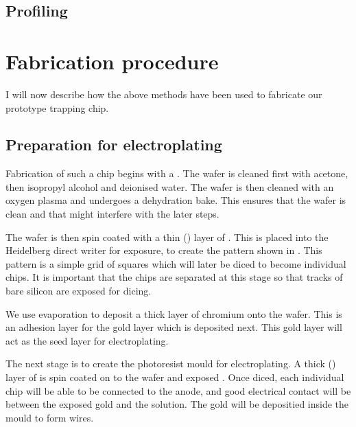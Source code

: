 \subsection{Profiling}


\section{Fabrication procedure}
\label{fab:procedure}


I will now describe how the above methods have been used to fabricate our
prototype trapping chip.

\subsection{Preparation for electroplating}

Fabrication of such a chip begins with a . The wafer
is cleaned first with acetone, then isopropyl alcohol and deionised water. The
wafer is then cleaned with an oxygen plasma and undergoes a dehydration bake.
This ensures that the wafer is clean and  that
might interfere with the later steps.

The wafer is then spin coated with a thin () layer of . This is placed into the Heidelberg direct writer for exposure, to
create the pattern shown in . This pattern is a simple grid of
 squares which will later be diced to become individual chips.
It is important that the chips are separated at this stage so that tracks of
bare silicon are exposed for dicing.

We use evaporation to deposit a  thick layer of chromium onto the
wafer. This is an adhesion layer for the  gold layer which is
deposited next. This gold layer will act as the seed layer for electroplating.

The next stage is to create the photoresist mould for electroplating. A thick
() layer of  is spin coated on to the
wafer and exposed . Once diced, each
individual chip will be able to be connected to the anode, and good electrical
contact will be  between the exposed gold and the solution. The gold
will be depositied inside the mould to form wires.

